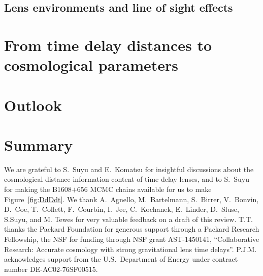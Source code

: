 \documentclass[smallextended]{svjour3}       %
\begin{document}

\subsection{Lens environments and line of sight effects}
\label{ssec:los}




\section{From time delay distances to cosmological parameters}
\label{sec:cosmo}




\section{Outlook}
\label{sec:outlook}




\section{Summary}
\label{sec:summary}




\begin{acknowledgements}
We are grateful to S.~Suyu and E.~Komatsu for insightful discussions
about the cosmological distance information content of time delay
lenses, and to S.~Suyu for making the B1608$+$656 MCMC chains
available for us to make Figure~\ref{fig:DdDdt}.
%
We thank A.~Agnello, M.~Bartelmann, S.~Birrer, V.~Bonvin, D.~Coe, T.~Collett,
F.~Courbin, I.~Jee, C.~Kochanek, E.~Linder, D.~Sluse, S.Suyu, and
M. Tewes for very valuable feedback on a draft of this review.
%
T.T. thanks the Packard Foundation for generous support through a
Packard Research Fellowship, the NSF for funding through NSF grant
AST-1450141, ``Collaborative Research: Accurate cosmology with strong
gravitational lens time delays''.
%
P.J.M. acknowledges support from the U.S.\ Department of Energy under
contract number DE-AC02-76SF00515.
\end{acknowledgements}



\end{document}
